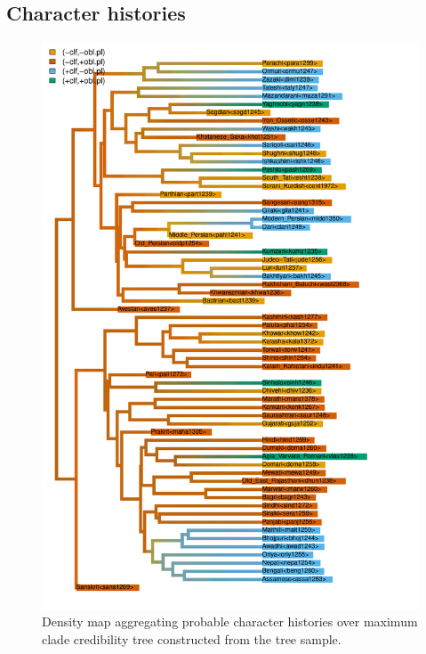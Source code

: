 \documentclass[11pt]{article}
\begin{document}
\subsection{Character histories}
\label{SCM}

\begin{figure}[h!]
\centering
\includegraphics[width=.7\linewidth]{code/density_map.pdf}
\caption{Density map aggregating probable character histories over maximum clade credibility tree constructed from the tree sample.}
\label{densitymap}
\end{figure}
\end{document}
